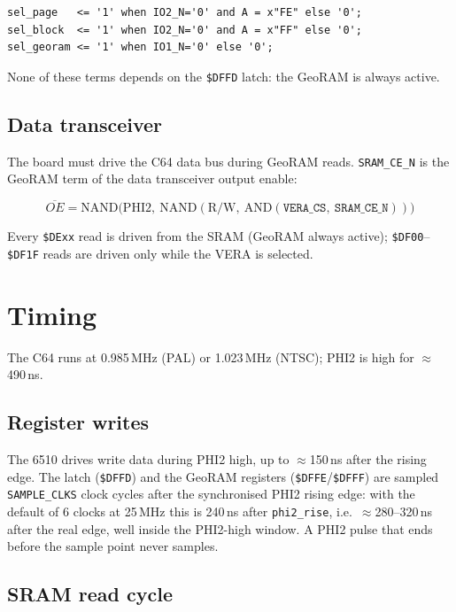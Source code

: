 \documentclass[11pt,a4paper]{article}
\newcommand{\cmd}[1]{\texttt{#1}}
\newcommand{\sig}[1]{\texttt{#1}}
\newcommand{\file}[1]{\texttt{#1}}
\newcommand{\hex}[1]{\texttt{\$#1}}
\begin{document}
\begin{lstlisting}[style=vhdl,caption={GeoRAM decode in \file{C6502\_Interface.vhd}}]
sel_page   <= '1' when IO2_N='0' and A = x"FE" else '0';
sel_block  <= '1' when IO2_N='0' and A = x"FF" else '0';
sel_georam <= '1' when IO1_N='0' else '0';
\end{lstlisting}

None of these terms depends on the \hex{DFFD} latch: the GeoRAM is always
active.

\subsection{Data transceiver}

The board must drive the C64 data bus during GeoRAM reads.
\sig{SRAM\_CE\_N} is the GeoRAM term of the data transceiver output enable:

\[
\overline{OE} = \text{NAND}\bigl(\text{PHI2},\ \text{NAND}(\text{R/W},\
                \text{AND}(\sig{VERA\_CS},\ \sig{SRAM\_CE\_N}))\bigr)
\]

Every \hex{DExx} read is driven from the SRAM (GeoRAM always active);
\hex{DF00}--\hex{DF1F} reads are driven only while the VERA is selected.

\section{Timing}
\label{sec:timing}

The C64 runs at 0.985\,MHz (PAL) or 1.023\,MHz (NTSC); PHI2 is high for
$\approx$490\,ns.

\subsection{Register writes}

The 6510 drives write data during PHI2 high, up to $\approx$150\,ns after
the rising edge.  The latch (\hex{DFFD}) and the GeoRAM registers
(\hex{DFFE}/\hex{DFFF}) are sampled \cmd{SAMPLE\_CLKS} clock cycles after
the synchronised PHI2 rising edge: with the default of 6 clocks at
25\,MHz this is 240\,ns after \cmd{phi2\_rise}, i.e.\ $\approx$280--320\,ns
after the real edge, well inside the PHI2-high window.  A PHI2 pulse that
ends before the sample point never samples.

\subsection{SRAM read cycle}
\end{document}
